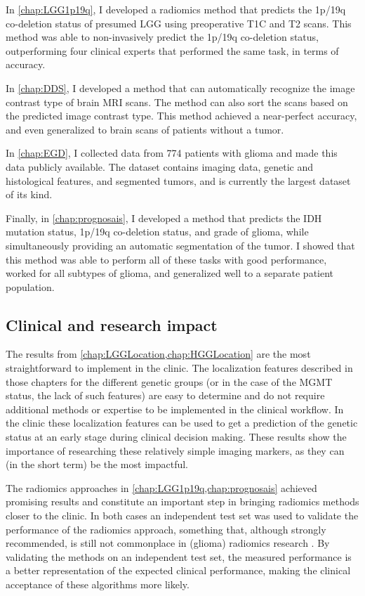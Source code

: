 In \cref{chap:LGG1p19q}, I developed a radiomics method that predicts the 1p/19q co-deletion status of presumed \gls{LGG} using preoperative \acrlong{T1C} and \acrlong{T2} scans.
This method was able to non-invasively predict the 1p/19q co-deletion status, outperforming four clinical experts that performed the same task, in terms of accuracy.

In \cref{chap:DDS}, I developed a method that can automatically recognize the image contrast type of brain \gls{MRI} scans.
The method can also sort the scans based on the predicted image contrast type.
This method achieved a near-perfect accuracy, and even generalized to brain scans of patients without a \gls{tumor}.

In \cref{chap:EGD}, I collected data from 774 patients with glioma and made this data publicly available.
The dataset contains imaging data, genetic and histological features, and segmented \glspl{tumor}, and is currently the largest dataset of its kind.

Finally, in \cref{chap:prognosais}, I developed a method that predicts the \gls{IDH} mutation status, 1p/19q co-deletion status, and grade of glioma, while simultaneously providing an automatic segmentation of the \gls{tumor}.
I showed that this method was able to perform all of these tasks with good performance, worked for all subtypes of glioma, and generalized well to a separate patient population.


\subsection{Clinical and research impact}

The results from \cref{chap:LGGLocation,chap:HGGLocation} are the most straightforward to implement in the clinic.
The localization features described in those chapters for the different genetic groups (or in the case of the \gls{MGMT} status, the lack of such features) are easy to determine and do not require additional methods or expertise to be implemented in the clinical workflow.
In the clinic these localization features can be used to get a prediction of the genetic status at an early stage during clinical decision making.
These results show the importance of researching these relatively simple imaging markers, as they can (in the short term) be the most impactful.

The radiomics approaches in \cref{chap:LGG1p19q,chap:prognosais} achieved promising results and constitute an important step in bringing radiomics methods closer to the clinic.
In both cases an independent test set was used to validate the performance of the radiomics approach, something that, although strongly recommended, is still not commonplace in (glioma) radiomics research \autocite{gillies2016radiomics, rizzo2018radiomics, lohmann2020radiomics, yip2016applicationsradiomics}.
By validating the methods on an independent test set, the measured performance is a better representation of the expected clinical performance, making the clinical acceptance of these algorithms more likely.

